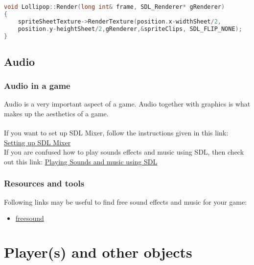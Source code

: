 \documentclass[11pt,fleqn]{book} %
\begin{document}
\begin{lstlisting}[language=C++, caption=Setting Sprite's dimensions; ]
void Lollipop::Render(long int& frame, SDL_Renderer* gRenderer)
{
    spriteSheetTexture->RenderTexture(position.x-widthSheet/2,
    position.y-heightSheet/2,gRenderer,&spriteClips, SDL_FLIP_NONE);
}
\end{lstlisting} 

\chapter{Audio}
    \section{Audio in a game}
    Audio is a very important aspect of a game. Audio together with graphics is what makes up the aesthetics of a game. \\ \\
    If you want to set up SDL Mixer, follow the instructions given in this link: \textcolor{blue}{\href{http://lazyfoo.net/tutorials/SDL/06_extension_libraries_and_loading_other_image_formats/index.php}{Setting up SDL Mixer}} \\
    If you are confused how to play sounds effects and music using SDL, then check out this link: \textcolor{blue}{\href{http://lazyfoo.net/tutorials/SDL/21_sound_effects_and_music/index.php}{Playing Sounds and music using SDL}} 
    
    \section{Resources and tools}
    Following links may be useful to find free sound effects and music for your game:
        \begin{itemize}
            \item \color{blue} \href{https://freesound.org/browse/tags/sound-effects/}{freesound} 
        \end{itemize}  


\part{Player(s) and other objects}
\end{document}
